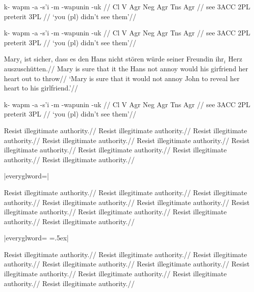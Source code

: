 \ex
\framewords
\begingl
\gla k- wapm -a -s'i -m -wapunin -uk //
\glb Cl V Agr Neg Agr Tns Agr //
 see {3\sc ACC} {} 2{\sc PL} preterit 3{\sc PL} //
\glft `you (pl) didn't see them'//
\endgl
\xe

\ex
\begingl[everyglword=\offinterlineskip]
\gla k- wapm -a -s'i -m -wapunin -uk //
\glb Cl V Agr Neg Agr Tns Agr //
 see {3\sc ACC} {} 2{\sc PL} preterit 3{\sc PL} //
\glft `you (pl) didn't see them'//
\endgl
\xe

\ex[abovemoreglskip=0pt]
\begingl
\gla Mary$_i$ ist sicher, dass es den Hans nicht st\"oren w\"urde
seiner Freundin ihr$_i$ Herz auszusch\"utten.//
\glb Mary is sure that it the Hans not annoy would
his girfriend her heart {out to
throw}//
\glft  `Mary is sure that it would not annoy John to reveal her
heart to his girlfriend.'//
\endgl
\xe


\ex
\begingl
\gla k- wapm -a -s'i -m -wapunin -uk //
\glb[everyglb=\ninerm] Cl V Agr Neg Agr Tns Agr //
 see {3\sc ACC} {} 2{\sc PL} preterit 3{\sc PL} //
\glft `you (pl) didn't see them'//
\endgl
\xe





\ex
\begingl[glstyle=wrap,everygla=\ninerm,everyglb=\tenrm,
   everyglc=\elevenrm,everygld=\twelverm,everygle=\twelvebf,everyglf=\ninerm]
\gla Resist illegitimate authority.//
\glb Resist illegitimate authority.//
\glc Resist illegitimate authority.//
\gld Resist illegitimate authority.//
\gle Resist illegitimate authority.//
\gld Resist illegitimate authority.//
\glc Resist illegitimate authority.//
\glb Resist illegitimate authority.//
\glf Resist illegitimate authority.//
\endgl
\xe


\ex  |everyglword=\offinterlineskip|
\medskip

\leavevmode
\begingl[glstyle=wrap,everygla=\ninerm,everyglb=\tenrm,
   everyglc=\elevenrm,everygld=\twelverm,everygle=\twelvebf,everyglf=\ninerm,
   everyglword=\offinterlineskip]
\gla Resist illegitimate authority.//
\glb Resist illegitimate authority.//
\glc Resist illegitimate authority.//
\gld Resist illegitimate authority.//
\gle Resist illegitimate authority.//
\gld Resist illegitimate authority.//
\glc Resist illegitimate authority.//
\glb Resist illegitimate authority.//
\glf Resist illegitimate authority.//
\endgl
\xe

\ex |everyglword={\baselineskip=0pt
\lineskip=.5ex}|
\smallskip

\leavevmode
\begingl[glstyle=wrap,everygla=\ninerm,everyglb=\tenrm,
   everyglc=\elevenrm,everygld=\twelverm,everygle=\twelvebf,everyglf=\ninerm,
   everyglword={\baselineskip=0pt \lineskip=.5ex}]
\gla Resist illegitimate authority.//
\glb Resist illegitimate authority.//
\glc Resist illegitimate authority.//
\gld Resist illegitimate authority.//
\gle Resist illegitimate authority.//
\gld Resist illegitimate authority.//
\glc Resist illegitimate authority.//
\glb Resist illegitimate authority.//
\glf Resist illegitimate authority.//
\endgl
\xe


